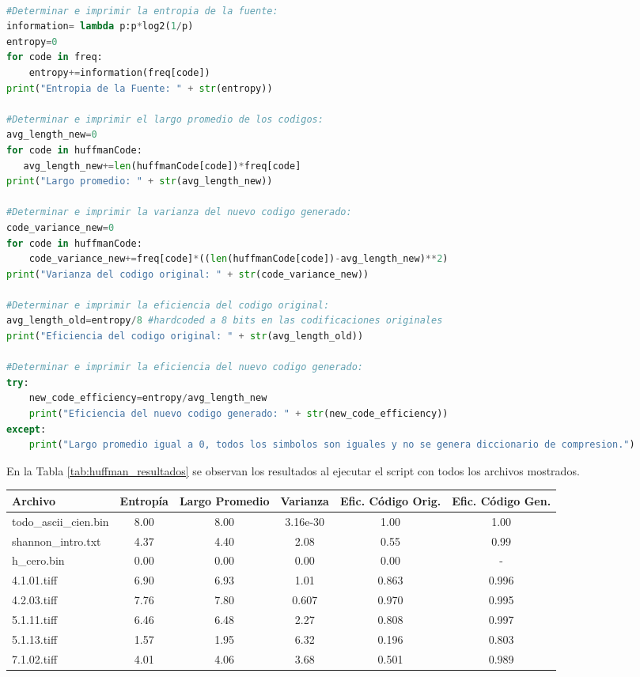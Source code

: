 \documentclass[conference,onecolumn,12pt]{IEEEtran}
\numberwithin{equation}{subsection}
\begin{document}
\begin{lstlisting}[language=Python, caption={Modificación del script para el cálculo de nuevos parámetros}, label={listing1}]

#Determinar e imprimir la entropia de la fuente:
information= lambda p:p*log2(1/p)
entropy=0
for code in freq:
    entropy+=information(freq[code])
print("Entropia de la Fuente: " + str(entropy))

#Determinar e imprimir el largo promedio de los codigos:
avg_length_new=0
for code in huffmanCode:
   avg_length_new+=len(huffmanCode[code])*freq[code]
print("Largo promedio: " + str(avg_length_new))

#Determinar e imprimir la varianza del nuevo codigo generado:
code_variance_new=0
for code in huffmanCode:
    code_variance_new+=freq[code]*((len(huffmanCode[code])-avg_length_new)**2)
print("Varianza del codigo original: " + str(code_variance_new))

#Determinar e imprimir la eficiencia del codigo original:
avg_length_old=entropy/8 #hardcoded a 8 bits en las codificaciones originales
print("Eficiencia del codigo original: " + str(avg_length_old))

#Determinar e imprimir la eficiencia del nuevo codigo generado:
try:
    new_code_efficiency=entropy/avg_length_new
    print("Eficiencia del nuevo codigo generado: " + str(new_code_efficiency))
except:
    print("Largo promedio igual a 0, todos los simbolos son iguales y no se genera diccionario de compresion.")

\end{lstlisting}


En la Tabla \ref{tab:huffman_resultados} se observan los resultados al ejecutar el script con todos los archivos mostrados.

\hfill\break \hfill\break \hfill\break \hfill\break \hfill\break
\hfill\break \hfill\break 


 \begin{table*}[h!]
    \centering
    \caption{Resultados de codificación Huffman sobre distintos archivos.}
    \label{tab:huffman_resultados}
    \begin{tabular}{lccccc}
    \toprule
    \textbf{Archivo} & \textbf{Entropía} & \textbf{Largo Promedio} & \textbf{Varianza} & \textbf{Efic. Código Orig.} & \textbf{Efic. Código Gen.} \\
    \midrule
    todo\_ascii\_cien.bin & 8.00 & 8.00 & 3.16e-30 & 1.00 & 1.00 \\
    shannon\_intro.txt & 4.37 & 4.40 & 2.08 & 0.55 & 0.99 \\
    h\_cero.bin & 0.00 & 0.00 & 0.00 & 0.00 & - \\
    4.1.01.tiff & 6.90 & 6.93 & 1.01 & 0.863 & 0.996 \\
    4.2.03.tiff & 7.76 & 7.80 & 0.607 & 0.970 & 0.995 \\
    5.1.11.tiff & 6.46 & 6.48 & 2.27 & 0.808 & 0.997 \\
    5.1.13.tiff & 1.57 & 1.95 & 6.32 & 0.196 & 0.803 \\
    7.1.02.tiff & 4.01 & 4.06 & 3.68 & 0.501 & 0.989 \\
    \bottomrule
    \end{tabular}
\end{table*}
\end{document}
